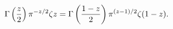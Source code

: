 \begin{equation}
\Gamma\left({z \over 2}\right) \pi^{-z/2} \zeta{z} = \Gamma \left({1-z \over 2}\right) \pi^{(z-1)/2} \zeta (1-z).
\end{equation}

